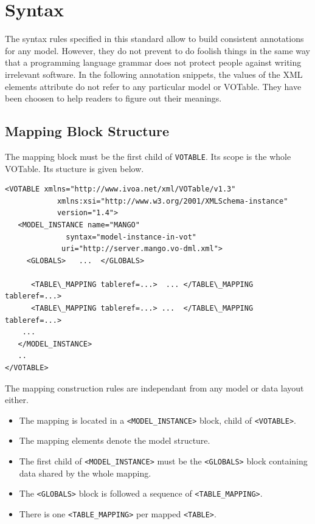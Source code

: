 \documentclass[11pt,a4paper]{ivoa}
\begin{document}
\section{Syntax}


The syntax rules specified in this standard allow to build consistent annotations for any model. However, they do not prevent to do foolish things in the same way that a programming language grammar does not protect people against writing irrelevant software.
In the following annotation snippets, the values of the XML elements attribute do not refer to any particular model or VOTable. They have been choosen to help readers to figure out their meanings.

\subsection{Mapping Block Structure}

The mapping block must be the first child of \texttt{VOTABLE}. Its scope is the whole VOTable. Its stucture is given below.

\begin{lstlisting}[caption={Complete mapping block example},style=XML]
<VOTABLE xmlns="http://www.ivoa.net/xml/VOTable/v1.3" 
            xmlns:xsi="http://www.w3.org/2001/XMLSchema-instance" 
            version="1.4">
   <MODEL_INSTANCE name="MANGO" 
              syntax="model-instance-in-vot"  
             uri="http://server.mango.vo-dml.xml">
     <GLOBALS>   ...  </GLOBALS>

      <TABLE\_MAPPING tableref=...>  ... </TABLE\_MAPPING tableref=...>
      <TABLE\_MAPPING tableref=...> ...  </TABLE\_MAPPING tableref=...>
    ...
   </MODEL_INSTANCE>
   ..
</VOTABLE>
\end{lstlisting}

The mapping construction rules are independant from any model or data layout either.

\begin{itemize}
    \item The mapping is located in a \texttt{<MODEL\_INSTANCE>} block, child of \texttt{<VOTABLE>}.
    \item The mapping elements denote the model structure.
    \item The first child of \texttt{<MODEL\_INSTANCE>} must be the \texttt{<GLOBALS>} block containing data shared by the whole mapping.    
    \item The \texttt{<GLOBALS>} block is followed a sequence of \texttt{<TABLE\_MAPPING>}.
    \item There is one \texttt{<TABLE\_MAPPING>} per mapped \texttt{<TABLE>}.
\end{itemize}
\FloatBarrier
\end{document}
